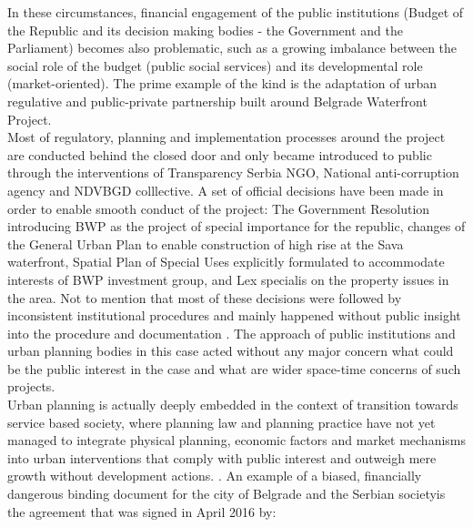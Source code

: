 \documentclass[11pt]{report}
\begin{document}
In these circumstances, financial engagement of the public institutions (Budget of the Republic and its decision making bodies - the Government and the Parliament) becomes also problematic, such as a growing imbalance between the social role of the budget (public social services) and its developmental role (market-oriented).
The prime example of the kind is the adaptation of urban regulative and public-private partnership built around Belgrade Waterfront Project.
\\
Most of regulatory, planning and implementation processes around the project are conducted behind the closed door and only became introduced to public through the interventions of Transparency Serbia NGO, National anti-corruption agency and NDVBGD colllective.
A set of official decisions have been made in order to enable smooth conduct of the project: The Government Resolution introducing BWP as the project of special importance for the republic, changes of the General Urban Plan to enable construction of high rise at the Sava waterfront, Spatial Plan of Special Uses explicitly formulated to accommodate interests of BWP investment group, and Lex specialis on the property issues in the area.\footnotemark
Not to mention that most of these decisions were followed by inconsistent institutional procedures and mainly happened without public insight into the procedure and documentation \cite{alternativni izvestaj}.
The approach of public institutions and urban planning bodies in this case acted without any major concern what could be the public interest in the case and what are wider space-time concerns of such projects.
\\
Urban planning is actually deeply embedded in the context of transition towards service based society, where planning law and planning practice have not yet managed to integrate physical planning, economic factors and market mechanisms into urban interventions that comply with public interest and outweigh mere growth without development actions. \cite{Vujosevic 2012}.
An example of a biased, financially dangerous binding document for the city of Belgrade and the Serbian society\footnotemark is the agreement that was signed in April 2016 by:
\end{document}
